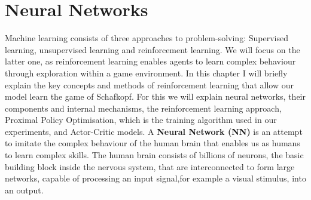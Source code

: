 \section{Neural Networks}
Machine learning consists of three approaches to problem-solving: Supervised learning, unsupervised learning and
reinforcement learning.
We will focus on the latter one, as reinforcement learning enables agents to learn complex behaviour through
exploration within a game environment.
In this chapter I will briefly explain the key concepts and methods of reinforcement learning that allow our model
learn the game of Schafkopf.
For this we will explain neural networks, their components and internal mechanisms, the reinforcement learning approach,
Proximal Policy Optimisation, which is the training algorithm used in our experiments, and Actor-Critic models.
\newline
A \textbf{Neural Network (NN)} is an attempt to imitate the complex behaviour of the human brain that
enables us as humans to learn complex skills.
The human brain consists of billions of neurons, the basic building block inside the nervous system, that are
interconnected to form large networks, capable of processing an input signal,for example a visual stimulus, into an
output.\\

